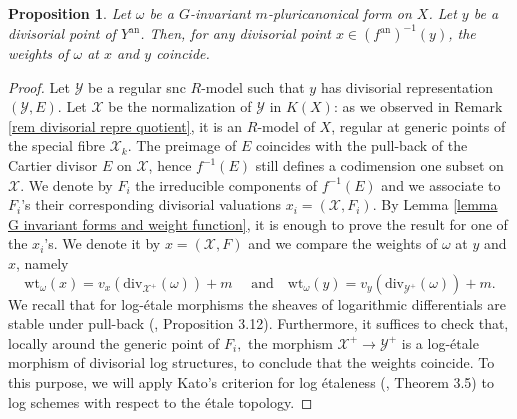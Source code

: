 \documentclass{amsart}%
\numberwithin{equation}{subsection}
\theoremstyle{plain2}
\newtheorem{prop}[equation]{Proposition}
\theoremstyle{definition2}
\theoremstyle{stepstyle}
\theoremstyle{point}
\theoremstyle{subpoint}
\newcommand{\cX}{\ensuremath{\mathscr{X}}}
\newcommand{\cY}{\ensuremath{\mathscr{Y}}}
\renewcommand{\cY}{\ensuremath{\mathscr{Y}}}
\newcommand{\an}{\mathrm{an}}
\newcommand{\divisor}{\mathrm{div}}
\newcommand{\weight}{\mathrm{wt}}
\begin{document}
\begin{prop} \label{prop:G inv form and corresponding weights}
Let $\omega$ be a $G$-invariant $m$-pluricanonical form on $X$. Let $y$ be a divisorial point of $Y^\an$. Then, for any divisorial point $x \in (f^\an)^{-1}(y)$, the weights of $\omega$ at $x$ and $y$ coincide.
\end{prop}
\begin{proof}
Let $\cY$ be a regular snc $R$-model such that $y$ has divisorial representation $(\cY,E)$. Let $\cX$ be the normalization of $\cY$ in $K(X)$: as we observed in Remark \ref{rem divisorial repre quotient}, it is an $R$-model of $X$, regular at generic points of the special fibre $\cX_k$. The preimage of $E$ coincides with the pull-back of the Cartier divisor $E$ on $\cX$, hence $f^{-1}(E)$ still defines a codimension one subset on $\cX$. We denote by $F_i$ the irreducible components of $f^{-1}(E)$ and we associate to $F_i$'s their corresponding divisorial valuations $x_i=(\cX,F_i)$. By Lemma \ref{lemma G invariant forms and weight function}, it is enough to prove the result for one of the $x_i$'s. We denote it by $x = (\cX,F)$ and we compare the weights of $\omega$ at $y$ and $x$, namely
$$\weight_{\omega}(x)=v_{x}(\divisor_{\cX^+}(\omega)) +m \quad \text{ and} \quad \weight_{\omega}(y)=v_{y}(\divisor_{\cY^+}(\omega)) +m. $$ We recall that for log-\'{e}tale morphisms the sheaves of logarithmic differentials are stable under pull-back (\cite{Kato1994a}, Proposition 3.12). Furthermore, it suffices to check that, locally around the generic point of $F_i,$ the morphism $\cX^+ \rightarrow \cY^+$ is a log-\'{e}tale morphism of divisorial log structures, to conclude that the weights coincide. To this purpose, we will apply Kato's criterion for log \'{e}taleness (\cite{Kato1989}, Theorem 3.5) to log schemes with respect to the \'{e}tale topology.


\end{proof}
\end{document}
